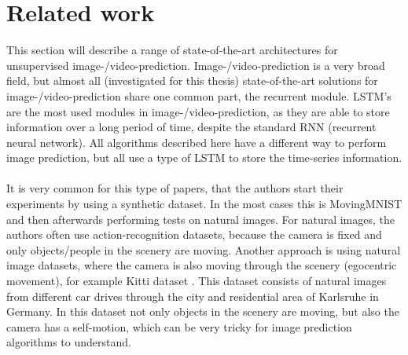\section{Related work} \label{section::related}
 This section will describe a range of state-of-the-art architectures for \glqq unsupervised\grqq{} image-/video-prediction. Image-/video-prediction is a very broad 
 field, but almost all (investigated for this thesis) state-of-the-art solutions
 for image-/video-prediction share one common part, the recurrent module. LSTM's are the most used modules in image-/video-prediction, as they are able to store information over a long period of time, despite
 the standard RNN (recurrent neural network). All algorithms described here have a different way to perform image prediction, but all use a type of LSTM to store the time-series information.
 \\\\
 It is very common for this type of papers, that the authors start their experiments by using a synthetic dataset. In the most cases this is MovingMNIST \cite{LeCun1998} and then afterwards performing
 tests on natural images. For natural images, the authors often use action-recognition datasets, because the camera is fixed and only objects/people in the scenery are moving. Another approach
 is using natural image datasets, where the camera is also moving through the scenery (egocentric movement), for example Kitti dataset \cite{Geiger2013}.
 This dataset consists of natural images from different car drives through the city and residential area of Karlsruhe in Germany.
 In this dataset not only objects in the scenery are moving, but also the camera has a self-motion, which can be very tricky for image prediction algorithms to 
 \glqq understand\grqq.
 
